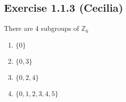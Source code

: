 \subsection*{Exercise 1.1.3 (Cecilia)}

There are 4 subgroups of $ \mathbb{Z}_6 $
\begin{enumerate}
    \item{$\{0\}$}
    \item{$\{0,3\}$}
    \item{$\{0,2,4\}$}
    \item{$\{0,1,2,3,4,5\}$}
\end{enumerate}